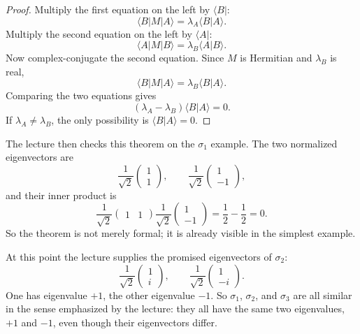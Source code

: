 \begin{proof}
Multiply the first equation on the left by \(\langle B|\):
\begin{equation}
\langle B|M|A\rangle=\lambda_A\langle B|A\rangle.
\end{equation}
Multiply the second equation on the left by \(\langle A|\):
\begin{equation}
\langle A|M|B\rangle=\lambda_B\langle A|B\rangle.
\end{equation}
Now complex-conjugate the second equation. Since \(M\) is Hermitian and \(\lambda_B\) is real,
\begin{equation}
\langle B|M|A\rangle=\lambda_B\langle B|A\rangle.
\end{equation}
Comparing the two equations gives
\begin{equation}
(\lambda_A-\lambda_B)\langle B|A\rangle=0.
\end{equation}
If \(\lambda_A\neq\lambda_B\), the only possibility is \(\langle B|A\rangle=0\).
\end{proof}

The lecture then checks this theorem on the \(\sigma_1\) example. The two normalized eigenvectors are
\begin{equation}
\frac{1}{\sqrt{2}}
\begin{pmatrix}
1\\
1
\end{pmatrix},
\qquad
\frac{1}{\sqrt{2}}
\begin{pmatrix}
1\\
-1
\end{pmatrix},
\end{equation}
and their inner product is
\begin{equation}
\frac{1}{\sqrt{2}}
\begin{pmatrix}
1 & 1
\end{pmatrix}
\frac{1}{\sqrt{2}}
\begin{pmatrix}
1\\
-1
\end{pmatrix}
=
\frac{1}{2}-\frac{1}{2}=0.
\end{equation}
So the theorem is not merely formal; it is already visible in the simplest example.

At this point the lecture supplies the promised eigenvectors of \(\sigma_2\):
\begin{equation}
\frac{1}{\sqrt{2}}
\begin{pmatrix}
1\\
i
\end{pmatrix},
\qquad
\frac{1}{\sqrt{2}}
\begin{pmatrix}
1\\
-i
\end{pmatrix}.
\end{equation}
One has eigenvalue \(+1\), the other eigenvalue \(-1\). So \(\sigma_1\), \(\sigma_2\), and \(\sigma_3\) are all similar in the sense emphasized by the lecture: they all have the same two eigenvalues, \(+1\) and \(-1\), even though their eigenvectors differ.

